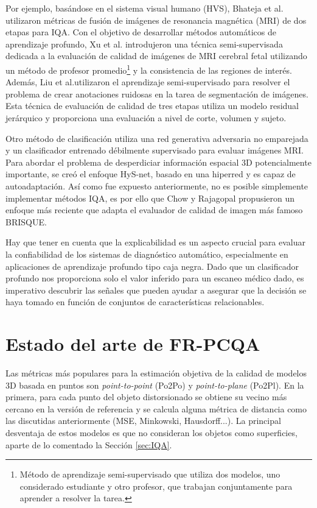 Por ejemplo, basándose en el sistema visual humano (HVS), 
Bhateja et al.\cite{MultiModalMRIFusionMethod} utilizaron métricas de fusión
de imágenes de resonancia magnética (MRI) de dos etapas para IQA.
Con el objetivo de desarrollar métodos automáticos de aprendizaje profundo,
Xu et al.\cite{SemiSupervisedMRIFetalBrain} introdujeron una técnica semi-supervisada dedicada a la evaluación de 
calidad de imágenes de MRI cerebral fetal utilizando un método de 
profesor promedio\footnote{
Método de aprendizaje semi-supervisado que utiliza dos modelos, 
uno considerado estudiante y otro profesor, que trabajan conjuntamente para aprender
a resolver la tarea.
} y la consistencia de las regiones de interés. 
Además, Liu et al.\cite{IQAForPediatricMRIWithNoisySegmentation}utilizaron el aprendizaje semi-supervisado para resolver 
el problema de crear anotaciones ruidosas en la tarea de segmentación de imágenes. 
Esta técnica de evaluación de calidad de tres etapas utiliza un modelo residual 
jerárquico y proporciona una evaluación a nivel de corte, volumen y sujeto. 

Otro método de clasificación utiliza una red generativa adversaria no emparejada 
y un clasificador entrenado débilmente supervisado para evaluar imágenes MRI\cite{MIGAN}.
Para abordar el problema de desperdiciar información espacial 3D potencialmente importante, 
se creó el enfoque HyS-net\cite{Hys-net}, basado en una hiperred y es capaz de 
autoadaptación\cite{Hys-net}. Así como fue expuesto anteriormente, no es posible 
simplemente implementar métodos IQA, es por ello que Chow y Rajagopal \cite{MedicalBRISQUE} 
propusieron un enfoque más reciente que adapta el evaluador de calidad de imagen más famoso BRISQUE\cite{BRISQUE}.

Hay que tener en cuenta que la explicabilidad es un aspecto crucial 
para evaluar la confiabilidad de los sistemas de diagnóstico automático, 
especialmente en aplicaciones de aprendizaje profundo tipo caja negra. 
Dado que un clasificador profundo nos proporciona solo el valor inferido 
para un escaneo médico dado, es imperativo descubrir las señales que pueden 
ayudar a asegurar que la decisión se haya tomado en función de conjuntos de 
características relacionables.

\section{Estado del arte de FR-PCQA}
Las métricas más populares para la estimación objetiva de la calidad de modelos 
3D basada en puntos son \emph{point-to-point} (Po2Po)\cite{PointToPoint} y
\emph{point-to-plane} (Po2Pl)\cite{PointToPlane}. 
En la primera, para cada punto del objeto distorsionado se obtiene su vecino más cercano en la versión de referencia y 
se calcula alguna métrica de distancia como las discutidas anteriormente (MSE, Minkowski, Hausdorff...). 
La principal desventaja de estos modelos es que no consideran los objetos como 
superficies, aparte de lo comentado la Sección \ref{sec:IQA}.


